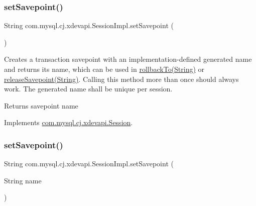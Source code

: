 \subsubsection{\texorpdfstring{set\+Savepoint()}{setSavepoint()}\hspace{0.1cm}{\footnotesize\ttfamily [1/2]}}
{\footnotesize\ttfamily String com.\+mysql.\+cj.\+xdevapi.\+Session\+Impl.\+set\+Savepoint (\begin{DoxyParamCaption}{ }\end{DoxyParamCaption})}

Creates a transaction savepoint with an implementation-\/defined generated name and returns its name, which can be used in \mbox{\hyperlink{classcom_1_1mysql_1_1cj_1_1xdevapi_1_1_session_impl_adcd0910556c2529fe20a6fa85c96a88d}{rollback\+To(\+String)}} or \mbox{\hyperlink{classcom_1_1mysql_1_1cj_1_1xdevapi_1_1_session_impl_a8bf42a1928a6bb71f3047e072b9210b4}{release\+Savepoint(\+String)}}. Calling this method more than once should always work. The generated name shall be unique per session.

\begin{DoxyReturn}{Returns}
savepoint name 
\end{DoxyReturn}


Implements \mbox{\hyperlink{interfacecom_1_1mysql_1_1cj_1_1xdevapi_1_1_session_a4878e02a60bbf177ea77ab94c697cbbf}{com.\+mysql.\+cj.\+xdevapi.\+Session}}.

\mbox{\label{classcom_1_1mysql_1_1cj_1_1xdevapi_1_1_session_impl_a4425c6c14d6b1159a23c0ede2b2e120d}} 
\subsubsection{\texorpdfstring{set\+Savepoint()}{setSavepoint()}\hspace{0.1cm}{\footnotesize\ttfamily [2/2]}}
{\footnotesize\ttfamily String com.\+mysql.\+cj.\+xdevapi.\+Session\+Impl.\+set\+Savepoint (\begin{DoxyParamCaption}\item[{String}]{name }\end{DoxyParamCaption})}

